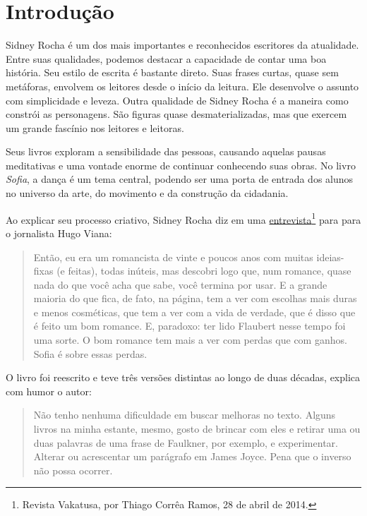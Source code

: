 \documentclass[12pt]{extarticle}
\begin{document}
\section{Introdução}

Sidney Rocha é um dos mais importantes e reconhecidos
escritores da atualidade. Entre suas qualidades, podemos destacar a capacidade
de contar uma boa história. Seu estilo de escrita é bastante direto. Suas
frases curtas, quase sem metáforas, envolvem os leitores desde o início da
leitura. Ele desenvolve o assunto com simplicidade e leveza. Outra qualidade de
Sidney Rocha é a maneira como constrói as personagens. São figuras quase
desmaterializadas, mas que exercem um grande fascínio nos leitores e leitoras. 

Seus livros exploram a sensibilidade das pessoas, causando aquelas pausas
meditativas e uma vontade enorme de continuar conhecendo suas obras.  No livro
\textit{Sofia}, a dança é um tema central, podendo ser uma porta de entrada dos alunos
no universo da arte, do movimento e da construção da cidadania. 

Ao explicar seu processo criativo, Sidney Rocha diz em uma 
\href{http://www.vacatussa.com/entrevista-sidney-rocha/}{entrevista}\footnote{
  Revista Vakatusa, por Thiago Corrêa Ramos, 28 de abril de 2014.} para para 
o jornalista Hugo Viana:

\begin{quote}
Então, eu era um romancista de vinte e poucos anos com muitas ideias-fixas (e feitas), todas inúteis, mas descobri logo que, num romance, quase nada do que você acha que sabe, você termina por usar. E a grande maioria do que fica, de fato, na página, tem a ver com escolhas mais duras e menos cosméticas, que tem a ver com a vida de verdade, que é disso que é feito um bom romance. E, paradoxo: ter lido Flaubert nesse tempo foi uma sorte. O bom romance tem mais a ver com perdas que com ganhos. Sofia é sobre essas perdas. 
\end{quote}

O livro foi reescrito e teve três versões distintas ao longo de duas décadas, explica com 
humor o autor:

\begin{quote}
 Não tenho nenhuma dificuldade em buscar melhoras no texto. Alguns livros na minha estante, mesmo, gosto de brincar com eles e retirar uma ou duas palavras de uma frase de Faulkner, por exemplo, e experimentar. Alterar ou acrescentar um parágrafo em James Joyce. Pena que o inverso não possa ocorrer.
\end{quote}
\end{document}
